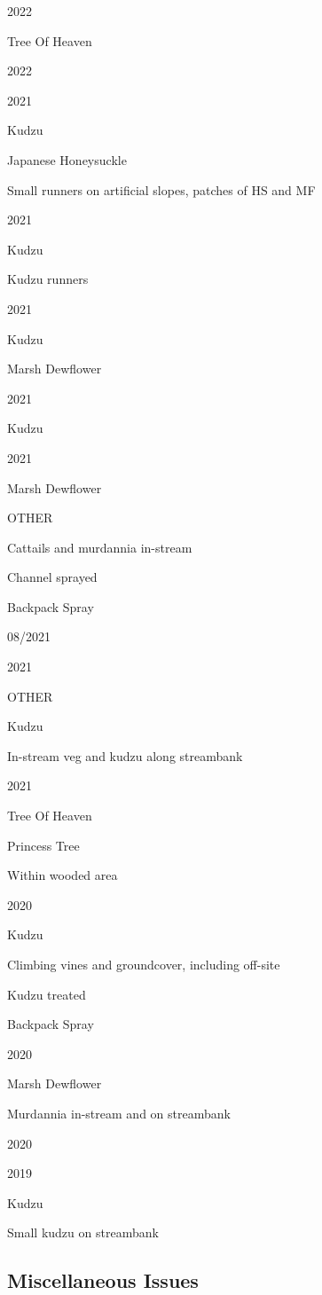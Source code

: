 \documentclass[
  landscape]{article}
\begin{document}
2022

Tree Of Heaven

2022

2021

Kudzu

Japanese Honeysuckle

Small runners on artificial slopes, patches of HS and MF

2021

Kudzu

Kudzu runners

2021

Kudzu

Marsh Dewflower

2021

Kudzu

2021

Marsh Dewflower

OTHER

Cattails and murdannia in-stream

Channel sprayed

Backpack Spray

08/2021

2021

OTHER

Kudzu

In-stream veg and kudzu along streambank

2021

Tree Of Heaven

Princess Tree

Within wooded area

2020

Kudzu

Climbing vines and groundcover, including off-site

Kudzu treated

Backpack Spray

2020

Marsh Dewflower

Murdannia in-stream and on streambank

2020

2019

Kudzu

Small kudzu on streambank

\hypertarget{miscellaneous-issues}{%
\subsection{Miscellaneous Issues}\label{miscellaneous-issues}}
\end{document}
